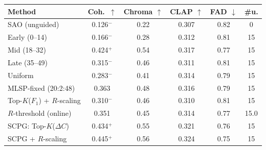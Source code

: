 \setlength{\tabcolsep}{2.5pt}
\begin{tabular}{@{}lccccc@{}}
\toprule
Method & Coh.\ $\uparrow$ & Chroma $\uparrow$ & CLAP $\uparrow$ & FAD $\downarrow$ & \#u.\\
\midrule
SAO (unguided) & 0.126$^{-}$ & 0.22 & 0.307 & 0.82 & 0\\
Early (0--14) & 0.166$^{-}$ & 0.28 & 0.312 & 0.81 & 15\\
Mid (18--32) & 0.424$^{+}$ & 0.54 & 0.317 & 0.77 & 15\\
Late (35--49) & 0.315$^{-}$ & 0.46 & 0.311 & 0.81 & 15\\
Uniform & 0.283$^{-}$ & 0.41 & 0.314 & 0.79 & 15\\
MLSP-fixed (20:2:48) & 0.363 & 0.48 & 0.316 & 0.79 & 15\\
Top-$K$($F_1$) + $R$-scaling & 0.310$^{-}$ & 0.46 & 0.310 & 0.81 & 15\\
$R$-threshold (online) & 0.351 & 0.45 & 0.314 & 0.77 & 15.0\\
SCPG: Top-$K$($\Delta C$) & 0.434$^{+}$ & 0.55 & 0.321 & 0.76 & 15\\
SCPG + $R$-scaling & 0.445$^{+}$ & 0.56 & 0.324 & 0.75 & 15\\
\bottomrule
\end{tabular}
